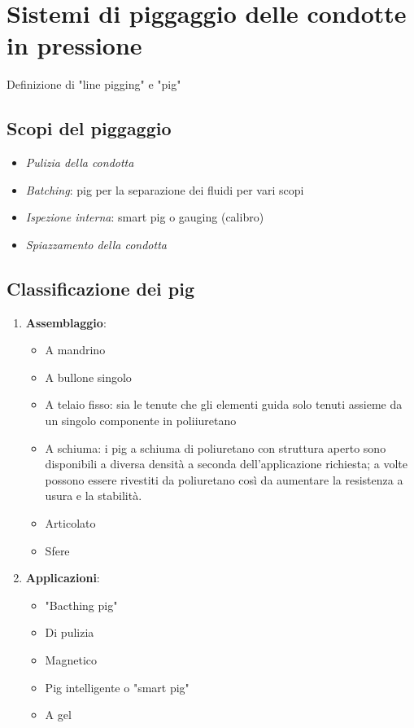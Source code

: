\clearpage{\pagestyle{empty}\cleardoublepage}
\chapter{Sistemi di piggaggio delle condotte in pressione}\thispagestyle{empty} 
Definizione di "line pigging" e "pig"
\section{Scopi del piggaggio}
	\begin{itemize}
		\item \textit{Pulizia della condotta}
		\item \textit{Batching}: pig per la separazione dei fluidi per vari scopi
		\item \textit{Ispezione interna}: smart pig o gauging (calibro)
		\item \textit{Spiazzamento della condotta}
	\end{itemize}
\section{Classificazione dei pig}
\begin{enumerate}
	\item \textbf{Assemblaggio}:
	\begin{itemize}
		\item A mandrino 
		\item A bullone singolo
		\item A telaio fisso: sia le tenute che gli elementi guida solo tenuti assieme da un singolo componente in poliiuretano
		\item A schiuma: i pig a schiuma di poliuretano con struttura aperto sono disponibili a diversa densità a seconda dell'applicazione richiesta; a volte possono essere rivestiti da poliuretano così da aumentare la resistenza a usura e la stabilità.
		\item Articolato
		\item Sfere
	\end{itemize}
	\item \textbf{Applicazioni}:
	\begin{itemize}
		\item "Bacthing pig"
		\item Di pulizia
		\item Magnetico
		\item Pig intelligente o "smart pig"
		\item A gel
	\end{itemize}
\end{enumerate}

